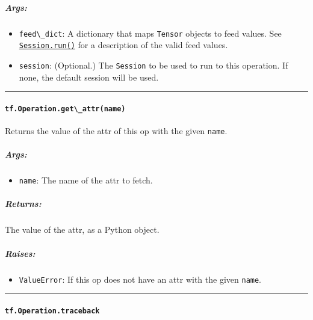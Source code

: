 \subparagraph{Args: }\label{args-12}

\begin{itemize}
\tightlist
\item
  \lstinline{feed\_dict}: A dictionary that maps \lstinline{Tensor} objects to
  feed values. See
  \href{../../api_docs/python/client.md\#Session.run}{\lstinline{Session.run()}}
  for a description of the valid feed values.
\item
  \lstinline{session}: (Optional.) The \lstinline{Session} to be used to run
  to this operation. If none, the default session will be used.
\end{itemize}

\begin{center}\rule{0.5\linewidth}{\linethickness}\end{center}

\paragraph{\texorpdfstring{\lstinline{tf.Operation.get\_attr(name)}
}{tf.Operation.get\_attr(name) }}\label{tf.operation.getux5fattrname}

Returns the value of the attr of this op with the given \lstinline{name}.

\subparagraph{Args: }\label{args-13}

\begin{itemize}
\tightlist
\item
  \lstinline{name}: The name of the attr to fetch.
\end{itemize}

\subparagraph{Returns: }\label{returns-16}

The value of the attr, as a Python object.

\subparagraph{Raises: }\label{raises-6}

\begin{itemize}
\tightlist
\item
  \lstinline{ValueError}: If this op does not have an attr with the given
  \lstinline{name}.
\end{itemize}

\begin{center}\rule{0.5\linewidth}{\linethickness}\end{center}

\paragraph{\texorpdfstring{\lstinline{tf.Operation.traceback}
}{tf.Operation.traceback }}\label{tf.operation.traceback}

